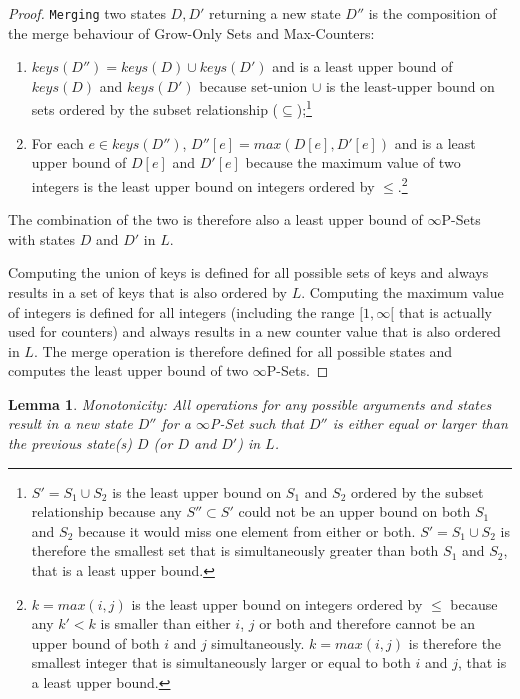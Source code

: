 \documentclass[11pt, oneside]{article}   	%
\newtheorem{lemma}{Lemma}
\begin{document}
\begin{proof}
\texttt{Merging} two states $D, D'$ returning a new state $D''$ is the composition of the merge behaviour of Grow-Only Sets and Max-Counters: 
\begin{enumerate}
  \item $\textit{keys}(D'')=\textit{keys}(D) \cup keys(D')$ and is a least upper bound of $\textit{keys}(D)$ and $\textit{keys}(D')$ because set-union $\cup$ is the least-upper bound on sets ordered by the subset relationship ($\subseteq$);\footnote{$S'=S_1 \cup S_2$ is the least upper bound on $S_1$ and $S_2$ ordered by the subset relationship because any $S'' \subset S'$ could not be an upper bound on both $S_1$ and $S_2$ because it would miss one element from either or both. $S'=S_1 \cup S_2$ is therefore the smallest set that is simultaneously greater than both $S_1$ and $S_2$, that is a least upper bound.}
  \item For each $e \in \textit{keys}(D'')$, $D''[e]=\textit{max}(D[e], D'[e])$ and is a least upper bound of $D[e]$ and $D'[e]$ because the maximum value of two integers is the least upper bound on integers ordered by $\leq$.\footnote{$k=\textit{max}(i,j)$ is the least upper bound on integers ordered by $\leq$ because any $k' < k$ is smaller than either $i$, $j$ or both and therefore cannot be an upper bound of both $i$ and $j$ simultaneously. $k=\textit{max}(i,j)$ is therefore the smallest integer that is simultaneously larger or equal to both $i$ and $j$, that is a least upper bound.}  
 \end{enumerate} 
  The combination of the two is therefore also a least upper bound of $\infty$P-Sets with states $D$ and $D'$ in $L$. 

Computing the union of keys is defined for all possible sets of keys and always results in a set of keys that is also ordered by $L$. Computing the maximum value of integers is defined for all integers (including the range $[1, \infty[$  that is actually used for counters) and always results in a new counter value that is also ordered in $L$. The merge operation is therefore defined for all possible states and computes the least upper bound of two $\infty$P-Sets.
\end{proof}

\begin{lemma}
\textit{Monotonicity}: All operations for any possible arguments and states result in a new state $D''$ for a  $\infty$P-Set such that $D''$ is either equal or larger than the previous state(s) $D$ (or $D$ and $D'$) in $L$.
\end{lemma}
\end{document}
